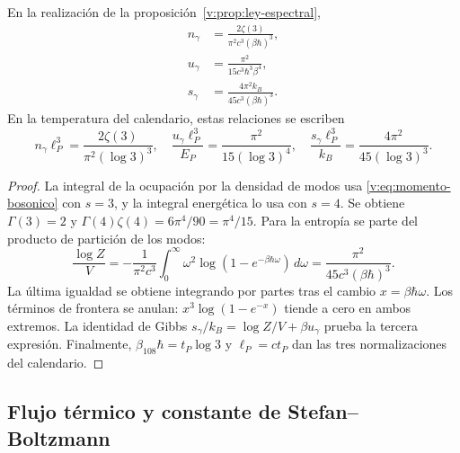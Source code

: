 \begin{proposition}
\label{v:prop:densidades-termicas}
En la realización de la proposición~\ref{v:prop:ley-espectral},
\begin{align}
 n_\gamma&=\frac{2\zeta(3)}{\pi^2c^3(\beta\hbar)^3},\\
 u_\gamma&=\frac{\pi^2}{15c^3\hbar^3\beta^4},\\
 s_\gamma&=\frac{4\pi^2 k_B}{45c^3(\beta\hbar)^3}.
 \label{v:eq:densidades-termicas}
\end{align}
En la temperatura del calendario, estas relaciones se escriben
\begin{equation}
 n_\gamma\ell_P^3=\frac{2\zeta(3)}{\pi^2(\log3)^3},\quad
 \frac{u_\gamma\ell_P^3}{E_P}=\frac{\pi^2}{15(\log3)^4},\quad
 \frac{s_\gamma\ell_P^3}{k_B}=\frac{4\pi^2}{45(\log3)^3}.
 \label{v:eq:densidades-calendario}
\end{equation}
\end{proposition}

\begin{proof}
La integral de la ocupación por la densidad de modos usa
\eqref{v:eq:momento-bosonico} con \(s=3\), y la integral energética
lo usa con \(s=4\). Se obtiene \(\Gamma(3)=2\) y
\(\Gamma(4)\zeta(4)=6\pi^4/90=\pi^4/15\).
Para la entropía se parte del producto de partición de los modos:
\[
 \frac{\log Z}{V}=-\frac{1}{\pi^2c^3}
 \int_0^\infty\omega^2
 \log(1-e^{-\beta\hbar\omega})\,d\omega
 =\frac{\pi^2}{45c^3(\beta\hbar)^3}.
\]
La última igualdad se obtiene integrando por partes tras el cambio
\(x=\beta\hbar\omega\). Los términos de frontera se anulan:
\(x^3\log(1-e^{-x})\) tiende a cero en ambos extremos.
La identidad de Gibbs \(s_\gamma/k_B=\log Z/V+\beta u_\gamma\)
prueba la tercera expresión. Finalmente,
\(\beta_{108}\hbar=t_P\log3\) y \(\ell_P=ct_P\) dan las tres
normalizaciones del calendario.
\end{proof}



\subsection{Flujo térmico y constante de Stefan--Boltzmann}


